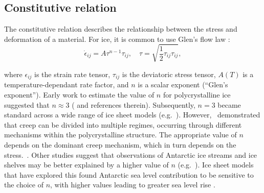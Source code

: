 \subsection{Constitutive relation}\label{sec:rheology}

The constitutive relation describes the relationship between the stress and deformation of a material. For ice, it is common to use Glen's flow law \citep{glenCreepPolycrystallineIce1955}:
\begin{equation}
    \label{eq:glenslaw}
    \dot{\epsilon}_{ij} = A \tau^{n-1} \tau_{ij}, \quad \tau = \sqrt{\frac{1}{2}\tau_{ij}\tau_{ij}},
\end{equation}

\noindent
where $\epsilon_{ij}$ is the strain rate tensor, $\tau_{ij}$ is the deviatoric stress tensor, $A(T)$ is a temperature-dependant rate factor, and $n$ is a scalar exponent (``Glen's exponent''). Early work to estimate the value of $n$ for polycrystalline ice suggested that $n \approx 3$ (\citealt{weertmanCREEPDEFORMATIONICE1983} and references therein). Subsequently, $n=3$ became standard across a wide range of ice sheet models (e.g.~\citealt{larourContinentalScaleHigh2012,cornfordAdaptiveMeshFinite2013,lipscombDescriptionEvaluationCommunity2019}). However,~\cite{goldsbySuperplasticDeformationIce2001} demonstrated that creep can be divided into multiple regimes, occurring through different mechanisms within the polycrystalline structure. The appropriate value of $n$ depends on the dominant creep mechanism, which in turn depends on the stress.~. Other studies suggest that observations of Antarctic ice streams and ice shelves may be better explained by a higher value of $n$ (e.g.~\citealt{cuffeyHowNonlinearCreep2011,millsteinIceViscosityMore2022}). Ice sheet models that have explored this found Antarctic sea level contribution to be sensitive to the choice of $n$, with higher values leading to greater sea level rise \citep{rosierCalibratedSeaLevel2025,getraerIncreasingGlenNye2025,martinRatesSeaLevelRise2026}.~


